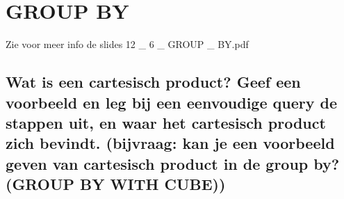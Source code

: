 \newpage

\section{GROUP BY}

Zie voor meer info de slides 12 \_ 6 \_ GROUP \_ BY.pdf

\subsection{Wat is een cartesisch product? Geef een voorbeeld en leg bij een eenvoudige query de stappen uit, en waar het cartesisch product zich bevindt. (bijvraag: kan je een voorbeeld geven van cartesisch product in de group by?(GROUP BY WITH CUBE))}